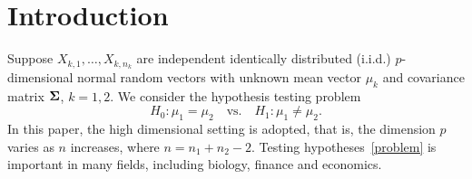 \documentclass[3p]{elsarticle}
\theoremstyle{plain}
\theoremstyle{definition}
\theoremstyle{remark}
\begin{document}



\section{Introduction}

Suppose $X_{k,1},\ldots,X_{k,n_k}$  are independent identically distributed (i.i.d.) $p$-dimensional normal random vectors with unknown mean vector $\mu_k$ and covariance matrix $\boldsymbol{\Sigma}$, $k=1,2$. We consider the hypothesis testing problem
\begin{equation}\label{problem}
    H_0:\mu_1=\mu_2\quad \textrm{vs.}\quad H_1:\mu_1\neq \mu_2.
\end{equation}
 In this paper, {the} high dimensional setting is adopted, that is, the dimension $p$ varies as $n$ increases, where $n=n_1+n_2-2$.
Testing hypotheses~\eqref{problem} is important in many fields, including biology, finance and economics.
\end{document}
